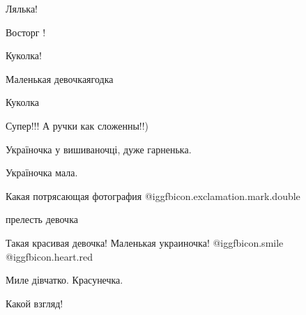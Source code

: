  
 
 
 
 

Лялька!

Восторг !

Куколка!

Маленькая девочка\-ягодка

Куколка

Супер!!! А ручки как сложенны!!)

Україночка у вишиваночці, дуже гарненька.

Україночка мала.

Какая потрясающая фотография @igg{fbicon.exclamation.mark.double}

прелесть девочка

Такая красивая девочка! Маленькая украиночка! @igg{fbicon.smile} @igg{fbicon.heart.red}

Миле дівчатко. Красунечка.

Какой взгляд!
